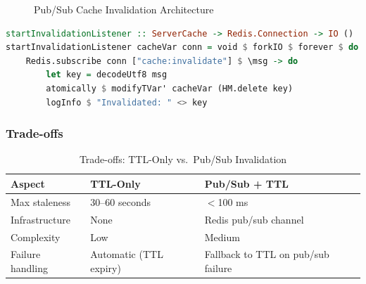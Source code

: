 \documentclass[12pt,a4paper]{report}
\begin{document}
\begin{figure}[h]
\centering
{}
\caption{Pub/Sub Cache Invalidation Architecture}
\label{fig:pubsub-invalidation}
\end{figure}

\begin{lstlisting}[language=Haskell, caption={Pub/Sub Invalidation Listener}]
startInvalidationListener :: ServerCache -> Redis.Connection -> IO ()
startInvalidationListener cacheVar conn = void $ forkIO $ forever $ do
    Redis.subscribe conn ["cache:invalidate"] $ \msg -> do
        let key = decodeUtf8 msg
        atomically $ modifyTVar' cacheVar (HM.delete key)
        logInfo $ "Invalidated: " <> key
\end{lstlisting}

\subsubsection{Trade-offs}

\begin{table}[h]
\centering
\begin{tabular}{@{} l p{5cm} p{5cm} @{}}
\toprule
\textbf{Aspect} & \textbf{TTL-Only} & \textbf{Pub/Sub + TTL} \\
\midrule
Max staleness & 30--60 seconds & $<$100 ms \\
Infrastructure & None & Redis pub/sub channel \\
Complexity & Low & Medium \\
Failure handling & Automatic (TTL expiry) & Fallback to TTL on pub/sub failure \\
\bottomrule
\end{tabular}
\caption{Trade-offs: TTL-Only vs.\ Pub/Sub Invalidation}
\label{tab:invalidation-tradeoffs}
\end{table}
\end{document}
